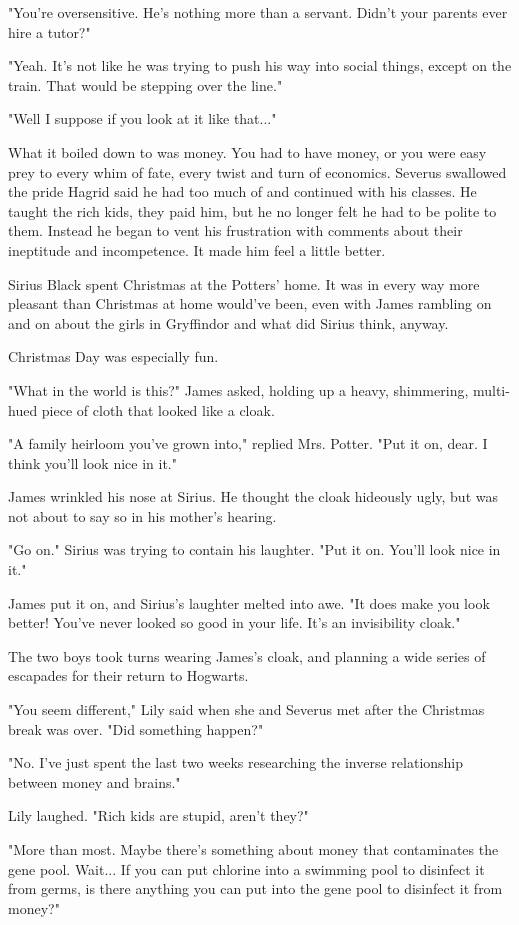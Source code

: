\documentclass[a4paper,11pt]{article}
\begin{document}
"You're oversensitive. He's nothing more than a servant. Didn't your parents ever hire a tutor?"

"Yeah. It's not like he was trying to push his way into social things, except on the train. That would be stepping over the line."

"Well I suppose if you look at it like that..."

What it boiled down to was money. You had to have money, or you were easy prey to every whim of fate, every twist and turn of economics. Severus swallowed the pride Hagrid said he had too much of and continued with his classes. He taught the rich kids, they paid him, but he no longer felt he had to be polite to them. Instead he began to vent his frustration with comments about their ineptitude and incompetence. It made him feel a little better.

Sirius Black spent Christmas at the Potters' home. It was in every way more pleasant than Christmas at home would've been, even with James rambling on and on about the girls in Gryffindor and what did Sirius think, anyway.

Christmas Day was especially fun.

"What in the world is this?" James asked, holding up a heavy, shimmering, multi-hued piece of cloth that looked like a cloak.

"A family heirloom you've grown into," replied Mrs. Potter. "Put it on, dear. I think you'll look nice in it."

James wrinkled his nose at Sirius. He thought the cloak hideously ugly, but was not about to say so in his mother's hearing.

"Go on." Sirius was trying to contain his laughter. "Put it on. You'll look nice in it."

James put it on, and Sirius's laughter melted into awe. "It does make you look better! You've never looked so good in your life. It's an invisibility cloak."

The two boys took turns wearing James's cloak, and planning a wide series of escapades for their return to Hogwarts.

"You seem different," Lily said when she and Severus met after the Christmas break was over. "Did something happen?"

"No. I've just spent the last two weeks researching the inverse relationship between money and brains."

Lily laughed. "Rich kids are stupid, aren't they?"

"More than most. Maybe there's something about money that contaminates the gene pool. Wait... If you can put chlorine into a swimming pool to disinfect it from germs, is there anything you can put into the gene pool to disinfect it from money?"
\end{document}
